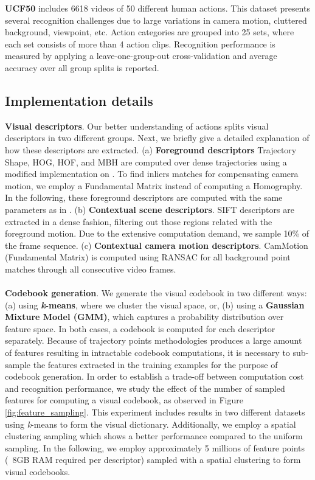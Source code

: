 \textbf{UCF50} \cite{reddy2013} includes 6618 videos of 50 different human actions.  This dataset presents several recognition challenges due to large variations in camera motion, cluttered background, viewpoint, etc. Action categories are grouped into 25 sets, where each set consists of more than 4 action clips. Recognition performance is measured by applying a leave-one-group-out cross-validation and average accuracy over all group splits is reported. 

\subsection{Implementation details}

\textbf{Visual descriptors}. Our better understanding of actions splits visual descriptors in two different groups. Next, we briefly give a detailed explanation of how these descriptors are extracted.
(a) \textbf{Foreground descriptors} \ie Trajectory Shape, HOG, HOF, and MBH are computed over dense trajectories using a modified implementation on \cite{wang2013}. To find inliers matches for compensating camera motion, we employ a Fundamental Matrix instead of computing a Homography. In the following, these foreground descriptors are computed with the same parameters as in \cite{wang2013}.
(b) \textbf{Contextual scene descriptors}. SIFT descriptors are extracted in a dense fashion, filtering out those regions related with the foreground motion. Due to the extensive computation demand, we sample 10\% of the frame sequence.
(c) \textbf{Contextual camera motion descriptors}. CamMotion (Fundamental Matrix) is computed using RANSAC for all background point matches through all consecutive video frames.\\\\
\textbf{Codebook generation}. We generate the visual codebook in two different ways: (a) using \textbf{\textit{k}-means}, where we cluster the visual space, or, (b) using a \textbf{Gaussian Mixture Model (GMM)}, which captures a probability distribution over feature space. In both cases, a codebook is computed for each descriptor separately. Because of trajectory points methodologies produces a large amount of features resulting in intractable codebook computations, it is necessary to sub-sample the features extracted in the training examples for the purpose of codebook generation. In order to establish a trade-off between computation cost and recognition performance, we study the effect of the number of sampled features for computing a visual codebook, as observed in Figure \ref{fig:feature_sampling}. This experiment includes results in two different datasets using \textit{k}-means to form the visual dictionary. Additionally, we employ a spatial clustering sampling  which shows a better performance compared to the uniform sampling. In the following, we employ approximately 5 millions of feature points (~8GB RAM required per descriptor) sampled with a spatial clustering to form visual codebooks.\\\\
